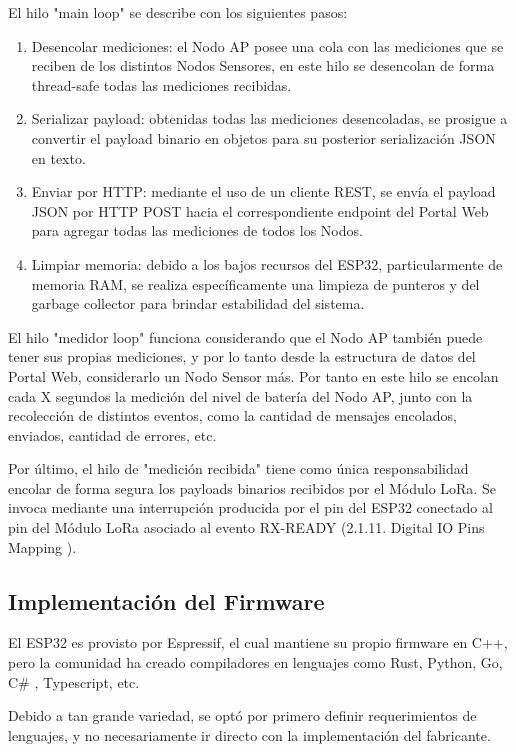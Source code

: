 El hilo "main loop" se describe con los siguientes pasos:
\begin{enumerate}
    \item Desencolar mediciones: el Nodo AP posee una cola con las mediciones que se reciben de los distintos Nodos Sensores, en este hilo se desencolan de forma thread-safe todas las mediciones recibidas.
    \item Serializar payload: obtenidas todas las mediciones desencoladas, se prosigue a convertir el payload binario en objetos para su posterior serialización JSON en texto.
    \item Enviar por HTTP: mediante el uso de un cliente REST, se envía el payload JSON por HTTP POST hacia el correspondiente endpoint del Portal Web para agregar todas las mediciones de todos los Nodos.
    \item Limpiar memoria: debido a los bajos recursos del ESP32, particularmente de memoria RAM, se realiza específicamente una limpieza de punteros y del garbage collector para brindar estabilidad del sistema.
\end{enumerate}

El hilo "medidor loop" funciona considerando que el Nodo AP también puede tener sus propias mediciones, y por lo tanto desde la estructura de datos del Portal Web, considerarlo un Nodo Sensor más. Por tanto en este hilo se encolan cada X segundos la medición del nivel de batería del Nodo AP, junto con la recolección de distintos eventos, como la cantidad de mensajes encolados, enviados, cantidad de errores, etc.

Por último, el hilo de "medición recibida" tiene como única responsabilidad encolar de forma segura los payloads binarios recibidos por el Módulo LoRa. Se invoca mediante una interrupción producida por el pin del ESP32 conectado al pin del Módulo LoRa asociado al evento RX-READY (2.1.11. Digital IO Pins Mapping \cite{LoraDatasheet}).

\subsection{Implementación del Firmware}

El ESP32 es provisto por Espressif, el cual mantiene su propio firmware en C++, pero la comunidad ha creado compiladores en lenguajes como Rust, Python, Go, C\# , Typescript, etc.

Debido a tan grande variedad, se optó por primero definir requerimientos de lenguajes, y no necesariamente ir directo con la implementación del fabricante.

